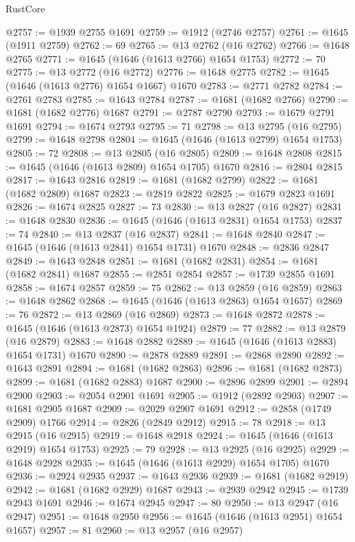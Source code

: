 \begin{lexlean}{RustCore}
\begin{coremodule}
@2757 := @1939 @2755 @1691
@2759 := @1912 (@2746 @2757)
@2761 := @1645 (@1911 @2759)
@2762 := 69
@2765 := @13 @2762 (@16 @2762)
@2766 := @1648 @2765
@2771 := @1645 (@1646 (@1613 @2766) @1654 @1753)
@2772 := 70
@2775 := @13 @2772 (@16 @2772)
@2776 := @1648 @2775
@2782 := @1645 (@1646 (@1613 @2776) @1654 @1667) @1670
@2783 := @2771 @2782
@2784 := @2761 @2783
@2785 := @1643 @2784
@2787 := @1681 (@1682 @2766)
@2790 := @1681 (@1682 @2776) @1687
@2791 := @2787 @2790
@2793 := @1679 @2791 @1691
@2794 := @1674 @2793
@2795 := 71
@2798 := @13 @2795 (@16 @2795)
@2799 := @1648 @2798
@2804 := @1645 (@1646 (@1613 @2799) @1654 @1753)
@2805 := 72
@2808 := @13 @2805 (@16 @2805)
@2809 := @1648 @2808
@2815 := @1645 (@1646 (@1613 @2809) @1654 @1705) @1670
@2816 := @2804 @2815
@2817 := @1643 @2816
@2819 := @1681 (@1682 @2799)
@2822 := @1681 (@1682 @2809) @1687
@2823 := @2819 @2822
@2825 := @1679 @2823 @1691
@2826 := @1674 @2825
@2827 := 73
@2830 := @13 @2827 (@16 @2827)
@2831 := @1648 @2830
@2836 := @1645 (@1646 (@1613 @2831) @1654 @1753)
@2837 := 74
@2840 := @13 @2837 (@16 @2837)
@2841 := @1648 @2840
@2847 := @1645 (@1646 (@1613 @2841) @1654 @1731) @1670
@2848 := @2836 @2847
@2849 := @1643 @2848
@2851 := @1681 (@1682 @2831)
@2854 := @1681 (@1682 @2841) @1687
@2855 := @2851 @2854
@2857 := @1739 @2855 @1691
@2858 := @1674 @2857
@2859 := 75
@2862 := @13 @2859 (@16 @2859)
@2863 := @1648 @2862
@2868 := @1645 (@1646 (@1613 @2863) @1654 @1657)
@2869 := 76
@2872 := @13 @2869 (@16 @2869)
@2873 := @1648 @2872
@2878 := @1645 (@1646 (@1613 @2873) @1654 @1924)
@2879 := 77
@2882 := @13 @2879 (@16 @2879)
@2883 := @1648 @2882
@2889 := @1645 (@1646 (@1613 @2883) @1654 @1731) @1670
@2890 := @2878 @2889
@2891 := @2868 @2890
@2892 := @1643 @2891
@2894 := @1681 (@1682 @2863)
@2896 := @1681 (@1682 @2873)
@2899 := @1681 (@1682 @2883) @1687
@2900 := @2896 @2899
@2901 := @2894 @2900
@2903 := @2054 @2901 @1691
@2905 := @1912 (@2892 @2903)
@2907 := @1681 @2905 @1687
@2909 := @2029 @2907 @1691
@2912 := @2858 (@1749 @2909) @1766
@2914 := @2826 (@2849 @2912)
@2915 := 78
@2918 := @13 @2915 (@16 @2915)
@2919 := @1648 @2918
@2924 := @1645 (@1646 (@1613 @2919) @1654 @1753)
@2925 := 79
@2928 := @13 @2925 (@16 @2925)
@2929 := @1648 @2928
@2935 := @1645 (@1646 (@1613 @2929) @1654 @1705) @1670
@2936 := @2924 @2935
@2937 := @1643 @2936
@2939 := @1681 (@1682 @2919)
@2942 := @1681 (@1682 @2929) @1687
@2943 := @2939 @2942
@2945 := @1739 @2943 @1691
@2946 := @1674 @2945
@2947 := 80
@2950 := @13 @2947 (@16 @2947)
@2951 := @1648 @2950
@2956 := @1645 (@1646 (@1613 @2951) @1654 @1657)
@2957 := 81
@2960 := @13 @2957 (@16 @2957)

\end{coremodule}
\end{lexlean}
